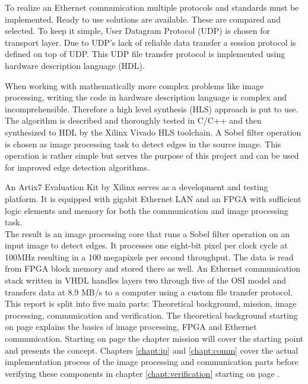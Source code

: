 To realize an Ethernet communication multiple protocols and standards must be
implemented. Ready to use solutions are available. These are compared and
selected. To keep it simple, User Datagram Protocol (UDP) is chosen for
transport layer. Due to UDP's lack of reliable data transfer a session protocol
is defined on top of UDP. This UDP file transfer protocol is implemented using
hardware description language (HDL).

When working with mathematically more complex problems like image processing,
writing the code in hardware description language is complex and
incomprehensible. Therefore a high level synthesis (HLS) approach is put to use.
The algorithm is described and thoroughly tested in C/C++ and then synthesized to
HDL by the Xilinx Vivado HLS toolchain. A Sobel filter operation is chosen as
image processing task to detect edges in the source image. This operation is
rather simple but serves the purpose of this project and can be used for
improved edge detection algorithms.

An Artix7 Evaluation Kit by Xilinx serves as a development and testing platform.
It is equipped with gigabit Ethernet LAN and an FPGA with sufficient logic
elements and memory for both the communication and image processing task.
\\

The result is an image processing core that runs a Sobel filter operation on an
input
image to detect edges. It processes one eight-bit pixel per clock cycle at
100MHz
resulting in a 100 megapixels per second throughput. The
data is read from FPGA block memory and stored there as well. An Ethernet
communication stack written in VHDL handles layers two through five of the OSI
model and transfers data at 8.9 MB/s to a computer using a custom file
transfer protocol.
\\

This report is split into five main parts: Theoretical background, mission,
image processing, communication and verification. 
The theoretical background starting
on page \pageref{chapt:theoreticalback} explains the basics of image
processing, FPGA and Ethernet communication. Starting on page 
\pageref{chapt:mission} the chapter mission will cover the starting point and
presents the concept. Chapters \ref{chapt:ip} and \ref{chapt:comm} cover the
actual implementation process of the image processing and communication parts
before verifying these components in chapter \ref{chapt:verification} starting
on page \pageref{chapt:verification}.

